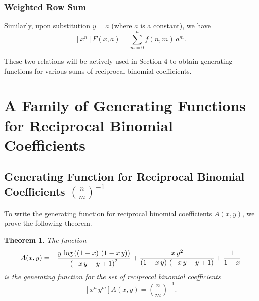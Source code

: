 \documentclass[12pt]{article}
\newtheorem{theorem}{Theorem}[section]
\begin{document}
\subsubsection{Weighted Row Sum}
Similarly, upon substitution $y=a$ (where $a$ is a constant), we have
\begin{equation}\label{eq:row-sum}
[x^n]F(x,a)=\sum_{m=0}^n f(n,m)\,a^m.
\end{equation}

These two relations will be actively used in Section 4 to obtain generating functions for various sums of reciprocal binomial coefficients.

\section{A Family of Generating Functions for Reciprocal Binomial Coefficients}

\subsection{Generating Function for Reciprocal Binomial Coefficients $\binom{n}{m}^{-1}$}

To write the generating function for reciprocal binomial coefficients $A(x,y)$, we prove the following theorem.

\begin{theorem}
The function
\begin{equation}\label{Lgf77}
A(x,y)=-{{y\,\log \left(\left(1-x\right)\,\left(1-x\,y\right)\right)
 }\over{\left(-x\,y+y+1\right)^2}}+{{x\,y^2}\over{\left(1-x\,y\right)
 \,\left(-x\,y+y+1\right)}}+{{1}\over{1-x}}
\end{equation}
is the generating function for the set of reciprocal binomial coefficients
$$
[x^n\,y^m]A(x,y)=\binom{n}{m}^{-1}.
$$
\end{theorem}
\end{document}
